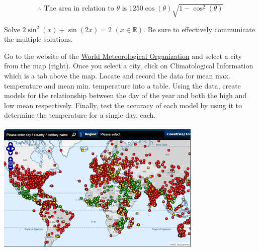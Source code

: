 \documentclass[12pt]{book}
\begin{document}
\begin{enumerate}
\vspace{-0.5cm}
$$\boxed{\therefore \text{ The area in relation to } \theta \text{ is } 1250\cos(\theta)\sqrt{1 - \cos^2(\theta)}}$$

\newpage


\item Solve $2\sin^2(x) + \sin(2x) = 2$ $(x \in \mathbb{R})$. Be sure to effectively communicate the multiple solutions.


\newpage

\begin{minipage}{4in}
\item Go to the website of the \href{http://worldweather.wmo.int/}{World Meteorological Organization} and select a city from the map (right).
Once you select a city, click on Climatological Information which is a tab above the map. Locate and record the data for mean max. temperature and mean min. temperature into a table. Using the data, create models for the relationship between the day of the year and both the high and low mean respectively. Finally, test the accuracy of each model by using it to determine the temperature for a single day, each.
\end{minipage}\hspace{0.2in}
\begin{minipage}{1in}
\includegraphics[scale=0.75]{WorldMap.png}
\end{minipage}

\newpage


\end{enumerate}
\end{document}
